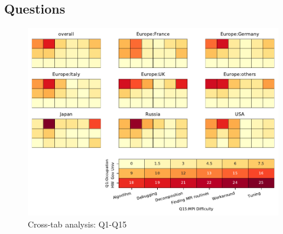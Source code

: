 
\subsection{Questions}


\begin{figure}
\begin{center}
\includegraphics[width=12cm]{../pdfs/Q1-Q15.pdf}
\caption{Cross-tab analysis: Q1-Q15}
\label{fig:Q1-Q15}
\end{center}
\end{figure}
